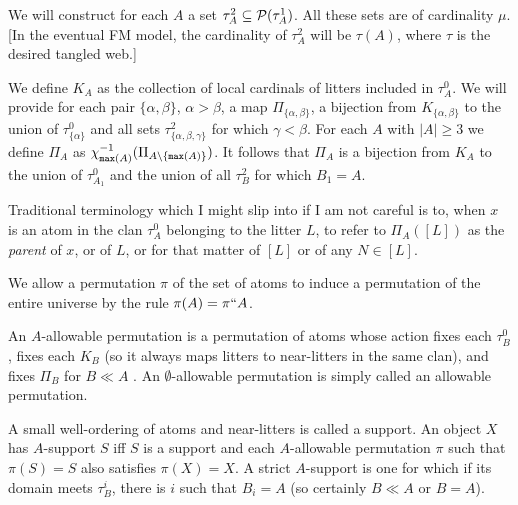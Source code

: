 \documentclass{slides}
\begin{document}
\begin{slide}

We will construct for each $A$ a set $\tau^2_A \subseteq {\cal P}(\tau^1_A)$.  All these sets are of cardinality $\mu$.   [In the eventual FM model, the cardinality of $\tau^2_A$ will be $\tau(A)$, where $\tau$ is the desired tangled web.]

We define $K_A$ as the collection of local cardinals of litters included in $\tau^0_A$.  We will provide for each pair $\{\alpha,\beta\}$, $\alpha>\beta$, a map $\Pi_{\{\alpha,\beta\}}$, a bijection from $K_{\{\alpha,\beta\}}$ to the union of
$\tau^0_{\{\alpha\}}$ and all sets $\tau^2_{\{\alpha,\beta,\gamma\}}$ for which $\gamma<\beta$.  For each $A$ with $|A|\geq 3$ we define $\Pi_A$ as $\chi_{{\tt max}(A)}^{-1}(\Pi_{A \setminus \{{\tt max}(A)\}})$.  It follows that $\Pi_A$ is a bijection from $K_A$ to the union of $\tau^0_{A_1}$ and the union of all $\tau^2_B$ for which $B_1=A$.

Traditional terminology which I might slip into if I am not careful is to, when $x$ is an atom in the clan $\tau^0_A$ belonging to the litter $L$, to refer to $\Pi_A([L])$ as the {\em parent\/} of $x$, or of $L$, or for that matter of $[L]$ or of any $N \in [L]$.

\end{slide}

\begin{slide}

We allow a permutation $\pi$ of the set of atoms to induce a permutation of the entire universe by the rule $\pi(A) =\pi``A$.

An $A$-allowable permutation is a permutation of atoms whose action fixes each $\tau^0_B$, fixes each $K_B$ (so it always maps litters to near-litters in the same clan), and fixes $\Pi_B$ for $B \ll A$
.  
An $\emptyset$-allowable permutation is simply called an allowable permutation.

A small well-ordering of atoms and near-litters is called a support.   An object $X$ has $A$-support $S$ iff $S$ is a support and each $A$-allowable permutation $\pi$ such that $\pi(S)=S$ also
satisfies $\pi(X)=X$.  A strict $A$-support is one for which if its domain meets $\tau^i_B$, %
there is $i$ such that $B_i=A$ (so certainly $B \ll A$ or $B=A$).

\end{slide}
\end{document}
